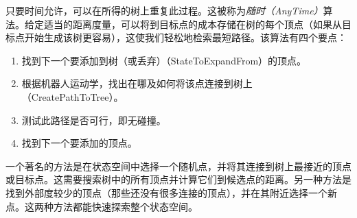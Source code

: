 
只要时间允许，可以在所得的树上重复此过程。这被称为\emph{随时（AnyTime）}算法。给定适当的距离度量，可以将到目标点的成本存储在树的每个顶点（如果从目标点开始生成该树更容易），这使我们轻松地检索最短路径。该算法有四个要点：

\begin{enumerate}

\item 找到下一个要添加到树（或丢弃）（StateToExpandFrom）的顶点。
\item 根据机器人运动学，找出在哪及如何将该点连接到树上（CreatePathToTree）。
\item 测试此路径是否可行，即无碰撞。
\item 找到下一个要添加的顶点。
\end{enumerate}


一个著名的方法是在状态空间中选择一个随机点，并将其连接到树上最接近的顶点或目标点。这需要搜索树中的所有顶点并计算它们到候选点的距离。另一种方法是找到外部度较少的顶点（那些还没有很多连接的顶点），并在其附近选择一个新点。这两种方法都能快速探索整个状态空间。


